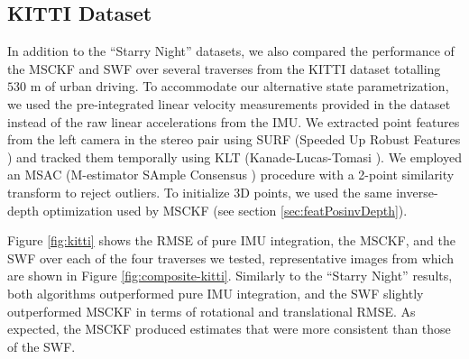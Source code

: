 \documentclass[letterpaper, 10 pt, conference]{ieeeconf}  %
\begin{document}
\subsection{KITTI Dataset}
In addition to the ``Starry Night'' datasets, we also compared the performance of the MSCKF and SWF over several traverses from the KITTI dataset \cite{Geiger:2013:IJRR} totalling $530$ m of urban driving.
To accommodate our alternative state parametrization, we used the pre-integrated linear velocity measurements provided in the dataset instead of the raw linear accelerations from the IMU. 
We extracted point features from the left camera in the stereo pair using SURF (Speeded Up Robust Features \cite{Bay:2008:CVIU}) and tracked them temporally using KLT (Kanade-Lucas-Tomasi \cite{Tomasi:91}). We employed an MSAC (M-estimator SAmple Consensus \cite{TorrZisserman:1998}) procedure with a 2-point similarity transform to reject outliers.  To initialize 3D points, we used the same inverse-depth optimization used by MSCKF (see section \ref{sec:featPosinvDepth}).

Figure \ref{fig:kitti} shows the RMSE of pure IMU integration, the MSCKF, and the SWF over each of the four traverses we tested, representative images from which are shown in Figure \ref{fig:composite-kitti}.
Similarly to the ``Starry Night'' results, both algorithms outperformed pure IMU integration, and the SWF slightly outperformed MSCKF in terms of rotational and translational RMSE.
As expected, the MSCKF produced estimates that were more consistent than those of the SWF.
\end{document}
